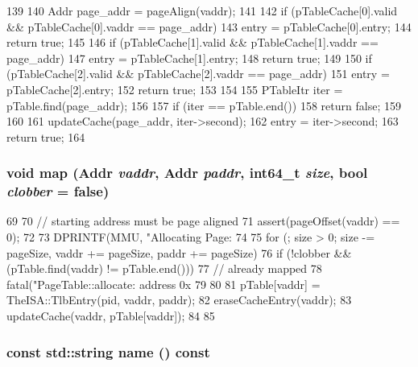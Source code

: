 \begin{DoxyCode}
139 {
140     Addr page_addr = pageAlign(vaddr);
141 
142     if (pTableCache[0].valid && pTableCache[0].vaddr == page_addr) {
143         entry = pTableCache[0].entry;
144         return true;
145     }
146     if (pTableCache[1].valid && pTableCache[1].vaddr == page_addr) {
147         entry = pTableCache[1].entry;
148         return true;
149     }
150     if (pTableCache[2].valid && pTableCache[2].vaddr == page_addr) {
151         entry = pTableCache[2].entry;
152         return true;
153     }
154 
155     PTableItr iter = pTable.find(page_addr);
156 
157     if (iter == pTable.end()) {
158         return false;
159     }
160 
161     updateCache(page_addr, iter->second);
162     entry = iter->second;
163     return true;
164 }
\end{DoxyCode}
\hypertarget{classPageTable_aff59f07ef2928facc67674a304b1e7e9}{
\subsubsection[{map}]{\setlength{\rightskip}{0pt plus 5cm}void map ({\bf Addr} {\em vaddr}, \/  {\bf Addr} {\em paddr}, \/  int64\_\-t {\em size}, \/  bool {\em clobber} = {\ttfamily false})}}
\label{classPageTable_aff59f07ef2928facc67674a304b1e7e9}



\begin{DoxyCode}
69 {
70     // starting address must be page aligned
71     assert(pageOffset(vaddr) == 0);
72 
73     DPRINTF(MMU, "Allocating Page: %
74 
75     for (; size > 0; size -= pageSize, vaddr += pageSize, paddr += pageSize) {
76         if (!clobber && (pTable.find(vaddr) != pTable.end())) {
77             // already mapped
78             fatal("PageTable::allocate: address 0x%
79         }
80 
81         pTable[vaddr] = TheISA::TlbEntry(pid, vaddr, paddr);
82         eraseCacheEntry(vaddr);
83         updateCache(vaddr, pTable[vaddr]);
84     }
85 }
\end{DoxyCode}
\hypertarget{classPageTable_a6490f765a824ced1cc94979609fe7e07}{
\subsubsection[{name}]{\setlength{\rightskip}{0pt plus 5cm}const std::string name () const}}
\label{classPageTable_a6490f765a824ced1cc94979609fe7e07}



